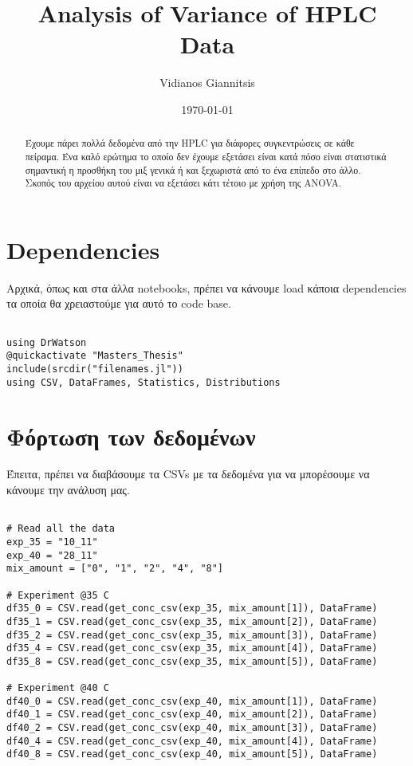 \documentclass[11pt]{article}
\author{Vidianos Giannitsis}
\date{\today}
\title{Analysis of Variance of HPLC Data}
\begin{document}
\maketitle
\tableofcontents

\begin{abstract}
Έχουμε πάρει πολλά δεδομένα από την HPLC για διάφορες συγκεντρώσεις σε κάθε πείραμα. Ένα καλό ερώτημα το οποίο δεν έχουμε εξετάσει είναι κατά πόσο είναι στατιστικά σημαντική η προσθήκη του μιξ γενικά ή και ξεχωριστά από το ένα επίπεδο στο άλλο. Σκοπός του αρχείου αυτού είναι να εξετάσει κάτι τέτοιο με χρήση της ANOVA.
\end{abstract}

\section{Dependencies}
\label{sec:orgfd081bb}
Αρχικά, όπως και στα άλλα notebooks, πρέπει να κάνουμε load κάποια dependencies τα οποία θα χρειαστούμε για αυτό το code base.

\begin{verbatim}

using DrWatson
@quickactivate "Masters_Thesis"
include(srcdir("filenames.jl"))
using CSV, DataFrames, Statistics, Distributions

\end{verbatim}

\section{Φόρτωση των δεδομένων}
\label{sec:orgb43cde9}
Έπειτα, πρέπει να διαβάσουμε τα CSVs με τα δεδομένα για να μπορέσουμε να κάνουμε την ανάλυση μας.

\begin{verbatim}

# Read all the data
exp_35 = "10_11"
exp_40 = "28_11"
mix_amount = ["0", "1", "2", "4", "8"]

# Experiment @35 C
df35_0 = CSV.read(get_conc_csv(exp_35, mix_amount[1]), DataFrame)
df35_1 = CSV.read(get_conc_csv(exp_35, mix_amount[2]), DataFrame)
df35_2 = CSV.read(get_conc_csv(exp_35, mix_amount[3]), DataFrame)
df35_4 = CSV.read(get_conc_csv(exp_35, mix_amount[4]), DataFrame)
df35_8 = CSV.read(get_conc_csv(exp_35, mix_amount[5]), DataFrame)

# Experiment @40 C
df40_0 = CSV.read(get_conc_csv(exp_40, mix_amount[1]), DataFrame)
df40_1 = CSV.read(get_conc_csv(exp_40, mix_amount[2]), DataFrame)
df40_2 = CSV.read(get_conc_csv(exp_40, mix_amount[3]), DataFrame)
df40_4 = CSV.read(get_conc_csv(exp_40, mix_amount[4]), DataFrame)
df40_8 = CSV.read(get_conc_csv(exp_40, mix_amount[5]), DataFrame)

\end{verbatim}
\end{document}
